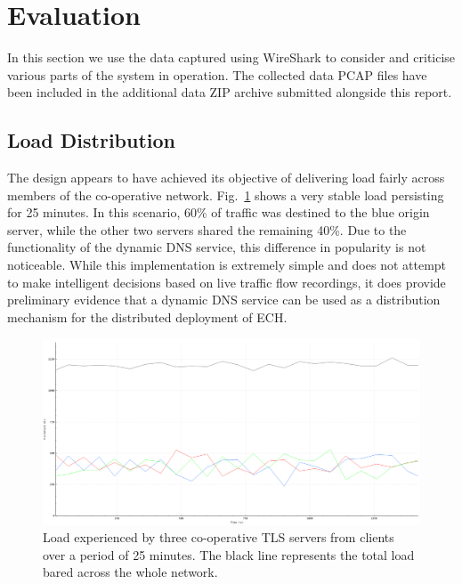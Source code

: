 \section{Evaluation}

In this section we use the data captured using WireShark to consider and criticise various parts of the system in operation.
The collected data PCAP files have been included in the additional data ZIP archive submitted alongside this report.


\subsection{Load Distribution}

The design appears to have achieved its objective of delivering load fairly across members of the co-operative network. Fig.~\ref{load_graph_figure} shows a very stable load persisting for 25 minutes. In this scenario, 60\% of traffic was destined to the blue origin server, while the other two servers shared the remaining 40\%. Due to the functionality of the dynamic DNS service, this difference in popularity is not noticeable. While this implementation is extremely simple and does not attempt to make intelligent decisions based on live traffic flow recordings, it does provide preliminary evidence that a dynamic DNS service can be used as a distribution mechanism for the distributed deployment of ECH.

\begin{figure}[ht]
\centerline{\includegraphics[width=120mm]{images/load.png}}
\caption[Load distribution graph]{Load experienced by three co-operative TLS servers from clients over a period of 25 minutes. The black line represents the total load bared across the whole network.}
\label{load_graph_figure}
\end{figure}




